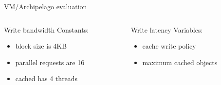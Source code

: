 \begin{frame}{VM/Archipelago evaluation}
	\begin{columns}[t]
		\begin{column}{.5\textwidth}
			Write bandwidth
			Constants:
			\begin{itemize}
				\item block size is 4KB
				\item parallel requests are 16
				\item cached has 4 threads
			\end{itemize}
		\end{column}
		\begin{column}{.5\textwidth}
			Write latency
			Variables:
			\begin{itemize}
				\item cache write policy
				\item maximum cached objects
			\end{itemize}
		\end{column}
	\end{columns}
\end{frame}




